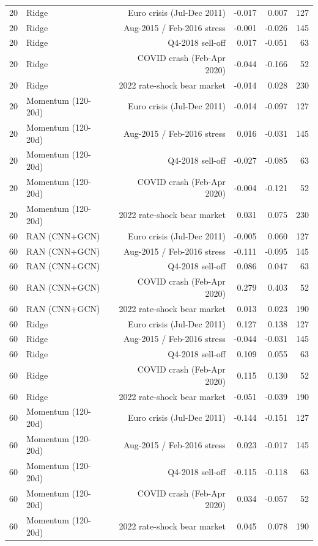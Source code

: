 \begin{table}[htbp]
{\begin{tabular}{llrrrr}
20 & Ridge & Euro crisis (Jul-Dec 2011) & -0.017 & 0.007 & 127 \\
20 & Ridge & Aug-2015 / Feb-2016 stress & -0.001 & -0.026 & 145 \\
20 & Ridge & Q4-2018 sell-off & 0.017 & -0.051 & 63 \\
20 & Ridge & COVID crash (Feb-Apr 2020) & -0.044 & -0.166 & 52 \\
20 & Ridge & 2022 rate-shock bear market & -0.014 & 0.028 & 230 \\
20 & Momentum (120-20d) & Euro crisis (Jul-Dec 2011) & -0.014 & -0.097 & 127 \\
20 & Momentum (120-20d) & Aug-2015 / Feb-2016 stress & 0.016 & -0.031 & 145 \\
20 & Momentum (120-20d) & Q4-2018 sell-off & -0.027 & -0.085 & 63 \\
20 & Momentum (120-20d) & COVID crash (Feb-Apr 2020) & -0.004 & -0.121 & 52 \\
20 & Momentum (120-20d) & 2022 rate-shock bear market & 0.031 & 0.075 & 230 \\
60 & RAN (CNN+GCN) & Euro crisis (Jul-Dec 2011) & -0.005 & 0.060 & 127 \\
60 & RAN (CNN+GCN) & Aug-2015 / Feb-2016 stress & -0.111 & -0.095 & 145 \\
60 & RAN (CNN+GCN) & Q4-2018 sell-off & 0.086 & 0.047 & 63 \\
60 & RAN (CNN+GCN) & COVID crash (Feb-Apr 2020) & 0.279 & 0.403 & 52 \\
60 & RAN (CNN+GCN) & 2022 rate-shock bear market & 0.013 & 0.023 & 190 \\
60 & Ridge & Euro crisis (Jul-Dec 2011) & 0.127 & 0.138 & 127 \\
60 & Ridge & Aug-2015 / Feb-2016 stress & -0.044 & -0.031 & 145 \\
60 & Ridge & Q4-2018 sell-off & 0.109 & 0.055 & 63 \\
60 & Ridge & COVID crash (Feb-Apr 2020) & 0.115 & 0.130 & 52 \\
60 & Ridge & 2022 rate-shock bear market & -0.051 & -0.039 & 190 \\
60 & Momentum (120-20d) & Euro crisis (Jul-Dec 2011) & -0.144 & -0.151 & 127 \\
60 & Momentum (120-20d) & Aug-2015 / Feb-2016 stress & 0.023 & -0.017 & 145 \\
60 & Momentum (120-20d) & Q4-2018 sell-off & -0.115 & -0.118 & 63 \\
60 & Momentum (120-20d) & COVID crash (Feb-Apr 2020) & 0.034 & -0.057 & 52 \\
60 & Momentum (120-20d) & 2022 rate-shock bear market & 0.045 & 0.078 & 190 \\
\bottomrule
\end{tabular}}
\end{table}